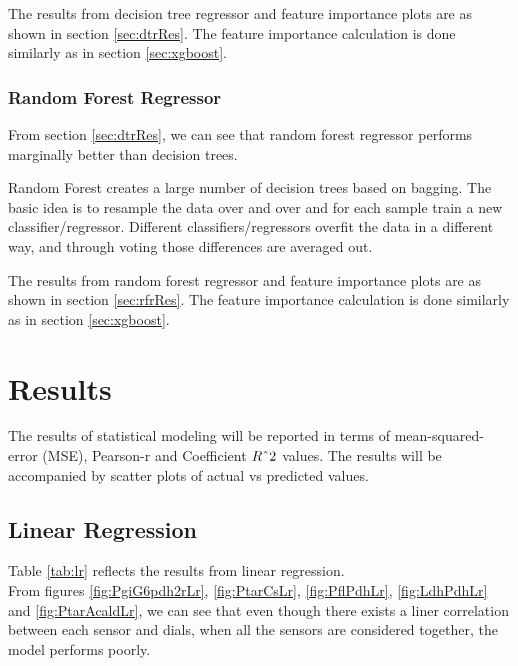 \documentclass[12pt,chapterheads]{ucsd}
\begin{document}
The results from decision tree regressor and feature importance plots are as shown in section \ref{sec:dtrRes}. The feature importance calculation is done similarly as in section \ref{sec:xgboost}.


\subsection{Random Forest Regressor}
From section \ref{sec:dtrRes}, we can see that random forest regressor performs marginally better than decision trees.

Random Forest creates a large number of decision trees based on bagging. The basic idea is to resample the data over and over and for each sample train a new classifier/regressor. Different classifiers/regressors overfit the data in a different way, and through voting those differences are averaged out.

The results from random forest regressor and feature importance plots are as shown in section \ref{sec:rfrRes}. The feature importance calculation is done similarly as in section \ref{sec:xgboost}. 




\chapter{Results} \label{chap:results}
The results of statistical modeling will be reported in terms of mean-squared-error \string(MSE), Pearson-r and Coefficient $R\string^2$ values. The results will be accompanied by scatter plots of actual vs predicted values.

\section{Linear Regression} \label{sec:lr}
Table \ref{tab:lr} reflects the results from linear regression.\\
From figures \ref{fig:PgiG6pdh2rLr}, \ref{fig:PtarCsLr}, \ref{fig:PflPdhLr}, \ref{fig:LdhPdhLr} and \ref{fig:PtarAcaldLr}, we can see that even though there exists a liner correlation between each sensor and dials, when all the sensors are considered together, the model performs poorly. 
\end{document}

